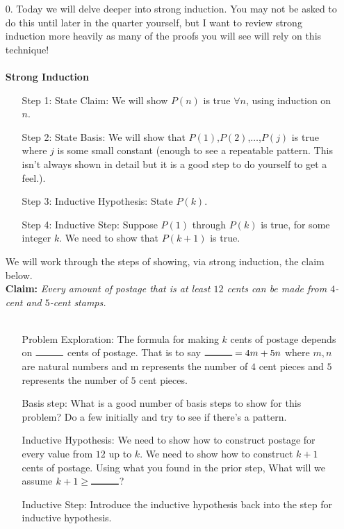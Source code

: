 \documentclass[12pt]{article}
\begin{document}
\begin{enumerate}
\item[0. ] Today we will delve deeper into strong induction. You may not 
be asked to do this until later in the quarter yourself, but I want 
to review strong induction more heavily as many of the proofs you will 
see will rely on this technique! 
\\\\
\textbf{Strong Induction}\\
\begin{enumerate}
\item[Step 1:] State Claim: We will show $P(n)$ is true $\forall n$, 
using induction on $n$.
\item[Step 2:]  State Basis: We will show that $P(1)$,$P(2)$,$\dots$,$P(j)$ is true where $j$ is some small constant (enough 
to see a repeatable pattern. This isn't always shown in detail but it is a good step to do yourself to get a feel.).
\item[Step 3:]  Inductive Hypothesis: State $P(k)$.
\item[Step 4:]  Inductive Step: Suppose $P(1)$ through $P(k)$ is true, for some integer $k$.
We need to show that $P(k+1)$ is true. 
\end{enumerate}
We will work through the steps of showing, via strong induction, the claim below.\\
\textbf{Claim: }\textit{Every amount of postage that is at least $12$ cents can be made from
$4$-cent and $5$-cent stamps.}\\\\
\begin{enumerate}
      \item[Problem Exploration:] The formula for making $k$ cents of postage depends on 
      $\rule{1cm}{0.30mm}$ cents of postage. That is to say $\rule{1cm}{0.30mm} = 4m + 5n$ where 
      $m,n$ are natural numbers and m represents the number of $4$ cent pieces and $5$ represents the number
      of $5$ cent pieces.
      \item[Basis step: ]What is a good number of basis steps to show for this 
      problem? Do a few initially and try to see if there's a pattern.
      \item[Inductive Hypothesis: ]We need to show how to construct postage for every 
      value from $12$ up to $k$. We need to show how to construct $k+1$ cents 
      of postage. Using what you found in the prior step, What will we assume 
      $k+1 \ge \rule{1cm}{0.30mm}$?
      \item[Inductive Step: ] Introduce the inductive hypothesis back into the step for inductive hypothesis.
\end{enumerate}
\newpage


\end{enumerate}
\end{document}
